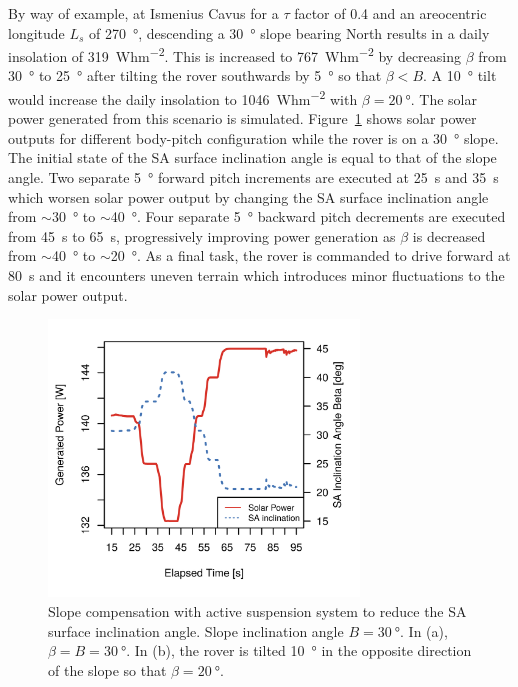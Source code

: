 \documentclass[twocolumn,letterpaper]{IEEEAerospaceCLS}  %
\newcommand{\refFig}[1]{{Figure}~\ref{#1}} %
\begin{document}
By way of example, at Ismenius Cavus for a $\tau$ factor of 0.4 and an areocentric longitude $L_{s}$ of \SI{270}{\degree}, descending a \SI{30}{\degree} slope bearing North results in a daily insolation of \SI{319}{Whm^{-2}}. This is increased to \SI{767}{Whm^{-2}} by decreasing $\beta$ from \SI{30}{\degree} to \SI{25}{\degree} after tilting the rover southwards by \SI{5}{\degree} so that $\beta < B$. A \SI{10}{\degree} tilt would increase the daily insolation to \SI{1046}{Whm^{-2}} with $\beta = \SI{20}{\degree}$. The solar power generated from this scenario is simulated. \refFig{fig:sub:rover-on-slope-beta} shows solar power outputs for different body-pitch configuration while the rover is on a \SI{30}{\degree} slope. The initial state of the \ac{SA} surface inclination angle is equal to that of the slope angle. Two separate \SI{5}{\degree} forward pitch increments are executed at \SI{25}{\second} and \SI{35}{\second} which worsen solar power output by changing the \ac{SA} surface inclination angle from $\sim$\SI{30}{\degree} to $\sim$\SI{40}{\degree}. Four separate \SI{5}{\degree} backward pitch decrements are executed from \SI{45}{\second} to \SI{65}{\second}, progressively improving power generation as $\beta$ is decreased from $\sim$\SI{40}{\degree} to $\sim$\SI{20}{\degree}. As a final task, the rover is commanded to drive forward at \SI{80}{\second} and it encounters uneven terrain which introduces minor fluctuations to the solar power output.


\begin{figure}[h]
  \centering
  \includegraphics[width=3.25in]{figures/plots/slope-compensation.png}
  \caption{Slope compensation with active suspension system to reduce the \ac{SA} surface inclination angle. Slope inclination angle $B = \SI{30}{\degree}$. In (a), $\beta = B = \SI{30}{\degree}$. In (b), the rover is tilted \SI{10}{\degree} in the opposite direction of the slope so that $\beta = \SI{20}{\degree}$.}
  \label{fig:sub:rover-on-slope-beta}
\end{figure}
\end{document}
